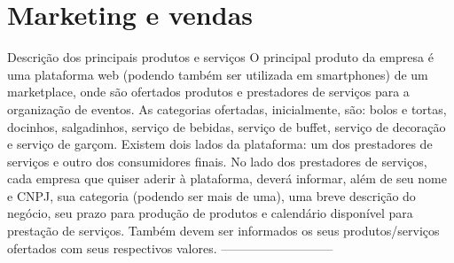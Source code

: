 \chapter{Marketing e vendas}
\label{chapter: Marketing e vendas}


\begin{commentA}

\par \end{commentA}


Descrição dos principais produtos e serviços 
O principal produto da empresa é uma plataforma web (podendo também ser utilizada em smartphones) de um marketplace, onde são ofertados produtos e prestadores de serviços para a organização de eventos. As categorias ofertadas, inicialmente, são: bolos e tortas, docinhos, salgadinhos, serviço de bebidas, serviço de buffet, serviço de decoração e serviço de garçom. 
Existem dois lados da plataforma: um dos prestadores de serviços e outro dos consumidores finais. No lado dos prestadores de serviços, cada empresa que quiser aderir à plataforma, deverá informar, além de seu nome e CNPJ, sua categoria (podendo ser mais de uma), uma breve descrição do negócio, seu prazo para produção de produtos e calendário disponível para prestação de serviços. Também devem ser informados os seus produtos/serviços ofertados com seus respectivos valores. 
--------------------------- 





 


